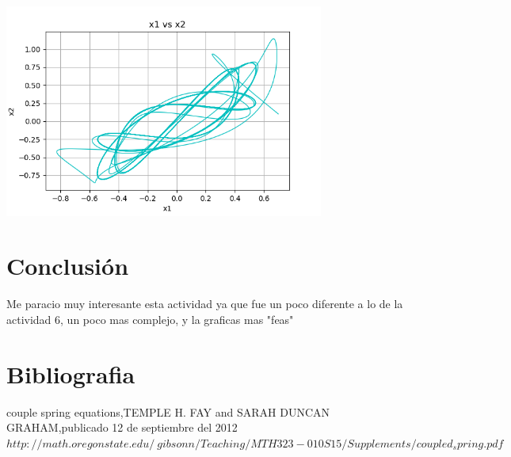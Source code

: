 \documentclass{article}
\begin{document}
\begin{center}
\includegraphics[height=7cm]{nolineal4_1_6.png}
\end{center}


\section{Conclusión}

Me paracio muy interesante esta actividad ya que fue un poco diferente a lo de la actividad 6, un poco mas complejo, y la graficas mas "feas"

\section{Bibliografia}

couple spring equations,TEMPLE H. FAY and SARAH DUNCAN GRAHAM,publicado 12 de septiembre del 2012
$http://math.oregonstate.edu/~gibsonn/Teaching/MTH323-010S15/Supplements/coupled_spring.pdf$
\end{document}
